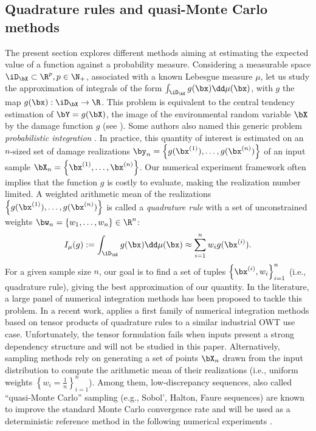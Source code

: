 \subsection{Quadrature rules and quasi-Monte Carlo methods}
The present section explores different methods aiming at estimating the expected value of a function against a probability measure. 
Considering a measurable space $\iD_\bX \subset \R^p, p \in \N_+$, associated with a known Lebesgue measure $\mu$, let us study the approximation of integrals of the form $\int_{\iD_\bX} g(\bx) \dd\mu(\bx)$, with $g$ the map $g(\bx): \iD_\bX \to \R$. 
This problem is equivalent to the central tendency estimation of $\bY = g(\bX)$, the image of the environmental random variable $\bX$ by the damage function $g$ (see ). 
Some authors also named this generic problem \emph{probabilistic integration} \citep{briol_oates_2019}. 
In practice, this quantity of interest is estimated on an $n$-sized set of damage realizations $\by_n = \left\{g(\bx^{(1)}), \dots, g(\bx^{(n)})\right\}$ of an input sample $\bX_n = \left\{\bx^{(1)}, \dots, \bx^{(n)}\right\}$. 
Our numerical experiment framework often implies that the function $g$ is costly to evaluate, making the realization number limited. 
A weighted arithmetic mean of the realizations $\left\{g(\bx^{(1)}), \dots, g(\bx^{(n)})\right\}$ is called a \emph{quadrature rule} with a set of unconstrained weights $\bw_n = \{w_1, \dots, w_n\} \in \R^n$:
\begin{equation}
    I_{\mu}(g) := \int_{\iD_\bX} g(\bx) \dd\mu(\bx) \approx \sum_{i=1}^n w_i g(\bx^{(i)}).
    \label{eq:quadrature_rule}
\end{equation}
For a given sample size $n$, our goal is to find a set of tuples $\left\{\bx^{(i)}, w_i \right\}_{i=1}^n$ (i.e., quadrature rule), giving the best approximation of our quantity. 
In the literature, a large panel of numerical integration methods has been proposed to tackle this problem. 
In a recent work, \cite{bos_2020} applies a first family of numerical integration methods based on tensor products of quadrature rules to a similar industrial OWT use case. 
Unfortunately, the tensor formulation fails when inputs present a strong dependency structure and will not be studied in this paper. 
Alternatively, sampling methods rely on generating a set of points $\bX_n$ drawn from the input distribution to compute the arithmetic mean of their realizations (i.e., uniform weights $\left\{w_i = \frac1n \right\}_{i=1}^n$). 
Among them, low-discrepancy sequences, also called ``quasi-Monte Carlo'' sampling (e.g., Sobol', Halton, Faure sequences) are known to improve the standard Monte Carlo convergence rate and will be used as a deterministic reference method in the following numerical experiments \citep{morokoff_1995}.

